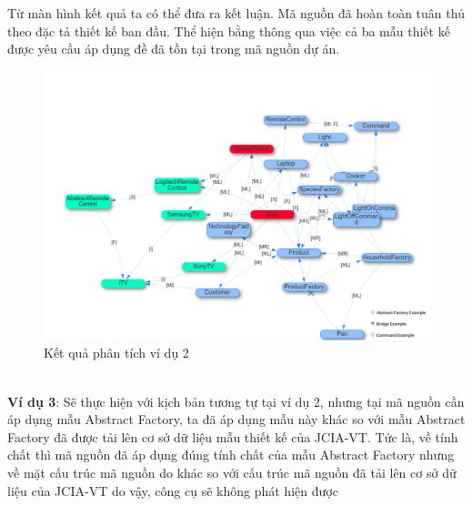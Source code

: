 \documentclass[12pt]{report}
\begin{document}
\noindent Từ màn hình kết quả ta có thể đưa ra kết luận. Mã nguồn đã hoàn toàn tuân thủ theo đặc tả thiết kế ban đầu. Thể hiện bằng thông qua việc cả ba mẫu thiết kế được yêu cầu áp dụng đề đã tồn tại trong mã nguồn dự án.\\
\begin{figure}[h]
	\vspace{-2.5cm}
	\centering
	\includegraphics[scale=0.4]{images/result_example_1}
	\caption{Kết quả phân tích ví dụ 2}
	\label{fig:result_example_2}
\end{figure}\\
\newpage
\noindent \textbf{Ví dụ 3}: Sẽ thực hiện với kịch bản tương tự tại ví dụ 2, nhưng tại mã nguồn cần áp dụng mẫu Abstract Factory, ta đã áp dụng mẫu này khác so với mẫu Abstract Factory đã được tải lên cơ sở dữ liệu mẫu thiết kế của JCIA-VT. Tức là, về tính chất thì mã nguồn đã áp dụng đúng tính chất của mẫu Abstract Factory nhưng về mặt cấu trúc mã nguồn do khác so với cấu trúc mã nguồn đã tải lên cơ sở dữ liệu của JCIA-VT do vậy, công cụ sẽ không phát hiện được
\end{document}
